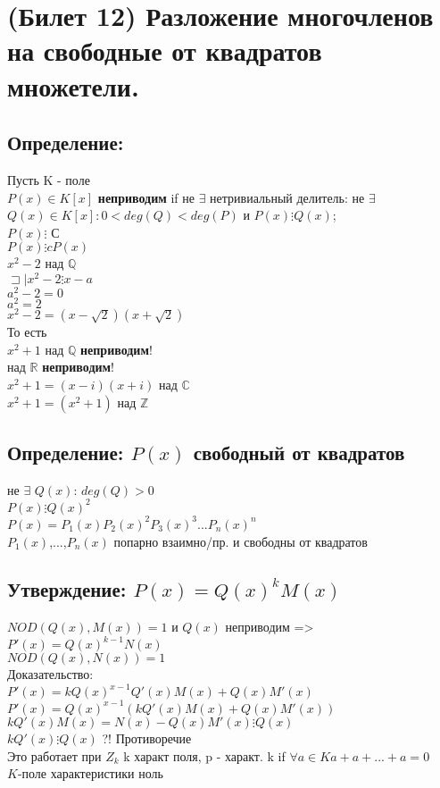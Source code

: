 \documentclass[12pt]{article}
\begin{document}
\setcounter{section}{11}

\section{(Билет 12) Разложение многочленов на свободные от квадратов множетели.}
\subsection{Определение:}
\noindent Пусть K - поле
  \\$P(x)\in K[x]$  \textbf{неприводим} if не $\exists$ нетривиальный делитель: не $\exists$ $Q(x) \in K[x]: 0 < deg(Q) < deg(P)$ и $ P(x) \vdots Q(x) $;
  \\$ P(x) \vdots  $ С 
  \\$ P(x) \vdots cP(x)$
  \\$x^2 - 2 $ над $\mathbb{Q}$
  \\$\sqsupset\mid x^2-2 \vdots x - a$
  \\$a^2-2=0$
  \\$a^2=2$
  \\$x^2-2=(x-\sqrt2)(x+\sqrt2)$
  \\То есть
  \\$x^2+1$ над $\mathbb{Q}$ \textbf{неприводим}!
  \\над $\mathbb{R}$ \textbf{неприводим}!
  \\$x^2+1=(x-i)(x+i)$ над $\mathbb{C}$
  \\$x^2+1=(x^2+1)$ над $\mathbb{Z}$
\subsection{Определение: $P(x)$ свободный от квадратов }
    \noindent не $\exists$ $ Q(x)$: $deg(Q) > 0$
    \\$ P(x) \vdots Q(x)^2 $ 
    \\$ P(x) = {P_1(x)}{P_2(x)^2}{P_3(x)^3}$...${P_n(x)^n}$
    \\${P_1(x)}$,...,${P_n(x)}$ попарно взаимно/пр. и свободны от квадратов
\subsection{Утверждение: $P(x) = Q(x)^kM(x)$}
\noindent $NOD(Q(x),M(x)) = 1$ и $Q(x)$ неприводим => $P'(x) = Q(x)^{k-1}N(x)$
\\$NOD(Q(x),N(x)) = 1$
\\ Доказательство: 
\\$P'(x) = kQ(x)^{x-1}Q'(x)M(x)+Q(x)M'(x)$
\\$P'(x) = Q(x)^{x-1}(kQ'(x)M(x)+Q(x)M'(x))$
\\$kQ'(x)M(x)=N(x)- Q(x)M'(x) \vdots Q(x)$
\\$kQ'(x)\vdots Q(x)$ ?! Противоречие
\\Это работает при $Z_k$ k характ поля, p - характ. k if $\forall a\in K a+a+...+a=0 $
\\$K$-поле характеристики ноль
\end{document}
